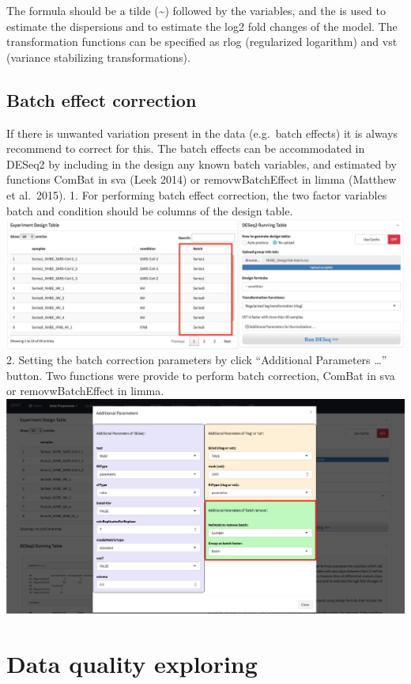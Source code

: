 \documentclass[
  a4paper,
  oneside]{book}
\begin{document}
The formula should be a tilde (\textasciitilde) followed by the variables, and the is used to estimate the dispersions and to estimate the log2 fold changes of the model. The transformation functions can be specified as rlog (regularized logarithm) and vst (variance stabilizing transformations).

\hypertarget{batch-effect-correction}{%
\section{Batch effect correction}\label{batch-effect-correction}}

If there is unwanted variation present in the data (e.g.~batch effects) it is always recommend to correct for this. The batch effects can be accommodated in DESeq2 by including in the design any known batch variables, and estimated by functions ComBat in sva (Leek 2014) or removwBatchEffect in limma (Matthew et al.~2015).
1. For performing batch effect correction, the two factor variables batch and condition should be columns of the design table.
\includegraphics{images/design_table-batch.jpeg}
2. Setting the batch correction parameters by click ``Additional Parameters \ldots{}'' button. Two functions were provide to perform batch correction, ComBat in sva or removwBatchEffect in limma.
\includegraphics{images/batch-remove-parameter.jpeg}

\hypertarget{data-quality-exploring}{%
\chapter{Data quality exploring}\label{data-quality-exploring}}
\end{document}
